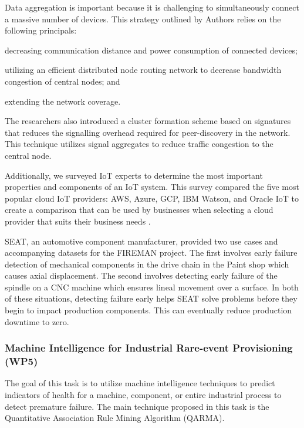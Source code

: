 Data aggregation is important because it is challenging to simultaneously connect a massive number of devices.
This strategy outlined by Authors \cite{massive-machine} relies on the following principals:
\begin{inlinelist}
  \item decreasing communication distance and power consumption of connected devices;
  \item utilizing an efficient distributed node routing network to decrease bandwidth congestion of central nodes; and
  \item extending the network coverage.
\end{inlinelist}
The researchers also introduced a cluster formation scheme based on signatures that reduces the signalling overhead required for peer-discovery in the network. This technique utilizes signal aggregates to reduce traffic congestion to the central node.

Additionally, we surveyed IoT experts to determine the most important properties and components of an IoT system.
This survey compared the five most popular cloud IoT providers: AWS, Azure, GCP, IBM Watson, and Oracle IoT to create a comparison that can be used by businesses when selecting a cloud provider that suits their business needs \parencite{choose-iot-9110590}.

SEAT, an automotive component manufacturer, provided two use cases and accompanying datasets for the FIREMAN project.
The first involves early failure detection of mechanical components in the drive chain in the Paint shop which causes axial displacement.
The second involves detecting early failure of the spindle on a CNC machine which ensures lineal movement over a surface.
In both of these situations, detecting failure early helps SEAT solve problems before they begin to impact production components.
This can eventually reduce production downtime to zero.

\subsubsection{Machine Intelligence for Industrial Rare-event Provisioning (WP5)}

The goal of this task is to utilize machine intelligence techniques to predict indicators of health for a machine, component, or entire industrial process to detect premature failure.
The main technique proposed in this task is the Quantitative Association Rule Mining Algorithm (QARMA).

